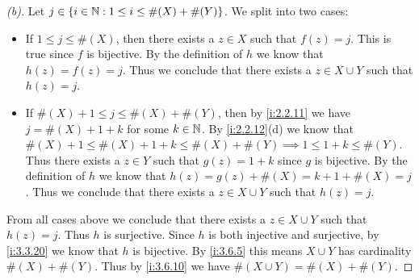 \begin{proof}[(b)]
  Let \(j \in \left\lbrace i \in \mathbb{N} : 1 \leq i \leq \#(X) + \#(Y)\right\rbrace\).
  We split into two cases:
  \begin{itemize}
    \item If \(1 \leq j \leq \#(X)\), then there exists a \(z \in X\) such that \(f(z) = j\).
          This is true since \(f\) is bijective.
          By the definition of \(h\) we know that \(h(z) = f(z) = j\).
          Thus we conclude that there exists a \(z \in X \cup Y\) such that \(h(z) = j\).
    \item If \(\#(X) + 1 \leq j \leq \#(X) + \#(Y)\), then by \cref{i:2.2.11} we have \(j = \#(X) + 1 + k\) for some \(k \in \mathbb{N}\).
          By \cref{i:2.2.12}(d) we know that \(\#(X) + 1 \leq \#(X) + 1 + k \leq \#(X) + \#(Y) \implies 1 \leq 1 + k \leq \#(Y)\).
          Thus there exists a \(z \in Y\) such that \(g(z) = 1 + k\) since \(g\) is bijective.
          By the definition of \(h\) we know that \(h(z) = g(z) + \#(X) = k + 1 + \#(X) = j\).
          Thus we conclude that there exists a \(z \in X \cup Y\) such that \(h(z) = j\).
  \end{itemize}
  From all cases above we conclude that there exists a \(z \in X \cup Y\) such that \(h(z) = j\).
  Thus \(h\) is surjective.
  Since \(h\) is both injective and surjective, by \cref{i:3.3.20} we know that \(h\) is bijective.
  By \cref{i:3.6.5} this means \(X \cup Y\) has cardinality \(\#(X) + \#(Y)\).
  Thus by \cref{i:3.6.10} we have \(\#(X \cup Y) = \#(X) + \#(Y)\).
\end{proof}

